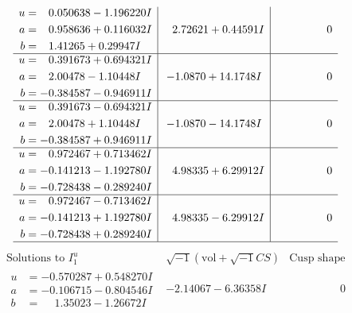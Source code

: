 \documentclass[1p]{elsarticle_modified}
\theoremstyle{definition}
\newcommand{\I}{\sqrt{-1}}
\begin{document}
$$\begin{array}{c|c|c}
\begin{aligned}
u &= \phantom{-}0.050638 - 1.196220 I \\
a &= \phantom{-}0.958636 + 0.116032 I \\
b &= \phantom{-}1.41265 + 0.29947 I\end{aligned}
 & \phantom{-}2.72621 + 0.44591 I & \phantom{-0.000000 } 0 \\ \hline\begin{aligned}
u &= \phantom{-}0.391673 + 0.694321 I \\
a &= \phantom{-}2.00478 - 1.10448 I \\
b &= -0.384587 - 0.946911 I\end{aligned}
 & -1.0870 + 14.1748 I & \phantom{-0.000000 } 0 \\ \hline\begin{aligned}
u &= \phantom{-}0.391673 - 0.694321 I \\
a &= \phantom{-}2.00478 + 1.10448 I \\
b &= -0.384587 + 0.946911 I\end{aligned}
 & -1.0870 - 14.1748 I & \phantom{-0.000000 } 0 \\ \hline\begin{aligned}
u &= \phantom{-}0.972467 + 0.713462 I \\
a &= -0.141213 - 1.192780 I \\
b &= -0.728438 - 0.289240 I\end{aligned}
 & \phantom{-}4.98335 + 6.29912 I & \phantom{-0.000000 } 0 \\ \hline\begin{aligned}
u &= \phantom{-}0.972467 - 0.713462 I \\
a &= -0.141213 + 1.192780 I \\
b &= -0.728438 + 0.289240 I\end{aligned}
 & \phantom{-}4.98335 - 6.29912 I & \phantom{-0.000000 } 0\\
 \hline 
 \end{array}$$\newpage$$\begin{array}{c|c|c}  
\text{Solutions to }I^u_{1}& \I (\text{vol} + \sqrt{-1}CS) & \text{Cusp shape}\\
 \hline 
\begin{aligned}
u &= -0.570287 + 0.548270 I \\
a &= -0.106715 - 0.804546 I \\
b &= \phantom{-}1.35023 - 1.26672 I\end{aligned}
 & -2.14067 - 6.36358 I & \phantom{-0.000000 } 0 \\ \hline\begin{aligned}

\end{aligned}
\end{array}$$
\end{document}
